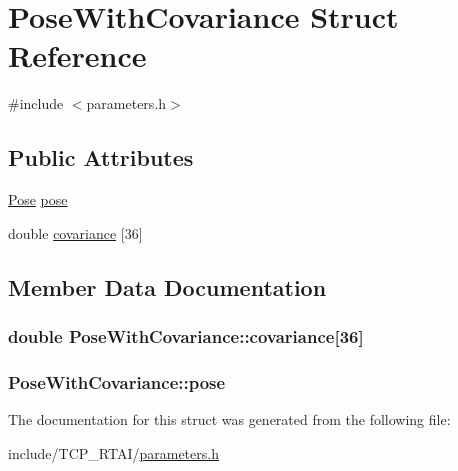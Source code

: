 \hypertarget{structPoseWithCovariance}{
\section{PoseWithCovariance Struct Reference}
\label{structPoseWithCovariance}
}


{\ttfamily \#include $<$parameters.h$>$}

\subsection*{Public Attributes}
\begin{DoxyCompactItemize}
\item 
\hyperlink{structPose}{Pose} \hyperlink{structPoseWithCovariance_ab23abbecb4cd809238ad25234f91159a}{pose}
\item 
double \hyperlink{structPoseWithCovariance_acf68d96737c9c1f6c7dda7d4b1a6000b}{covariance} \mbox{[}36\mbox{]}
\end{DoxyCompactItemize}


\subsection{Member Data Documentation}
\hypertarget{structPoseWithCovariance_acf68d96737c9c1f6c7dda7d4b1a6000b}{
\subsubsection[{covariance}]{\setlength{\rightskip}{0pt plus 5cm}double {\bf PoseWithCovariance::covariance}\mbox{[}36\mbox{]}}}
\label{structPoseWithCovariance_acf68d96737c9c1f6c7dda7d4b1a6000b}
\hypertarget{structPoseWithCovariance_ab23abbecb4cd809238ad25234f91159a}{
\subsubsection[{pose}]{ {\bf PoseWithCovariance::pose}}}
\label{structPoseWithCovariance_ab23abbecb4cd809238ad25234f91159a}


The documentation for this struct was generated from the following file:\begin{DoxyCompactItemize}
\item 
include/TCP\_\-RTAI/\hyperlink{include_2TCP__RTAI_2parameters_8h}{parameters.h}\end{DoxyCompactItemize}
